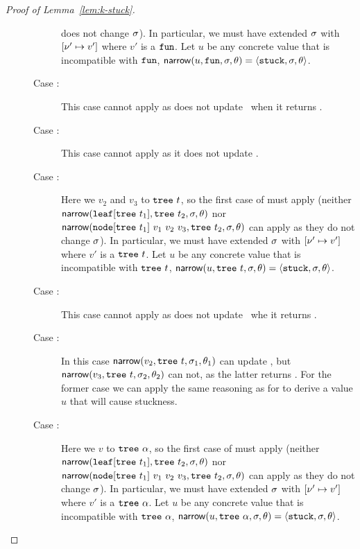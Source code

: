 \begin{proof}[Proof of Lemma~\ref{lem:k-stuck}]
\begin{description}
\begin{description}
      does not change $\sigma$).
      In particular, we must have extended $\sigma$ with
      $[\nu' \mapsto v']$ where $v'$ is a $\mathtt{fun}$.
      Let $u$ be any concrete value that is incompatible with $\mathtt{fun}$,
      $\mathsf{narrow}(u, \mathtt{fun}, \sigma, \theta) = \langle \mathtt{stuck}, \sigma, \theta \rangle$.
    \item[Case \reappbad:]
      This case cannot apply as \forcesym does not update \vsu\ when
      it returns \stuck.
    \item[Case \releafgood:]
      This case cannot apply as it does not update \vsu.
    \item[Case \renodegood:]
      Here we \forcesym $v_2$ and $v_3$ to $\mathtt{tree}\ t$, so the first
      case of \forcesym must apply
      (neither $\mathsf{narrow}(\mathtt{leaf}[\mathtt{tree}\ t_1], \mathtt{tree}\ t_2, \sigma, \theta)$
       nor\\ $\mathsf{narrow}(\mathtt{node}[\mathtt{tree}\ t_1]\ v_1\ v_2\ v_3, \mathtt{tree}\ t_2, \sigma, \theta)$
       can apply as they do not change $\sigma$).
      In particular, we must have extended $\sigma$ with
      $[\nu' \mapsto v']$ where $v'$ is a $\mathtt{tree}\ t$.
      Let $u$ be any concrete value that is incompatible with $\mathtt{tree}\ t$,
      $\mathsf{narrow}(u, \mathtt{tree}\ t, \sigma, \theta) = \langle \mathtt{stuck}, \sigma, \theta \rangle$.
    \item[Case \renodebadone:]
      This case cannot apply as \forcesym does not update \vsu\ whe
      it returns \stuck.
    \item[Case \renodebadtwo:]
      In this case $\mathsf{narrow}(v_2, \mathtt{tree}\ t, \sigma_1, \theta_1)$ can update
      \vsu, but $\mathsf{narrow}(v_3, \mathtt{tree}\ t, \sigma_2, \theta_2)$ can not, as the
      latter returns \stuck.
      For the former case we can apply the same reasoning as for
      \renodegood to derive a value $u$ that will cause stuckness.
    \item[Case \rulename{E-Case-Good\{1,2\}}:]
      Here we \forcesym $v$ to $\mathtt{tree}\ \alpha$, so the first case of \forcesym
      must apply
      (neither\\ $\mathsf{narrow}(\mathtt{leaf}[\mathtt{tree}\ t_1], \mathtt{tree}\ t_2, \sigma, \theta)$
       nor\\ $\mathsf{narrow}(\mathtt{node}[\mathtt{tree}\ t_1]\ v_1\ v_2\ v_3, \mathtt{tree}\ t_2, \sigma, \theta)$
       can apply as they do not change $\sigma$).
      In particular, we must have extended $\sigma$ with
      $[\nu' \mapsto v']$ where $v'$ is a $\mathtt{tree}\ \alpha$.
      Let $u$ be any concrete value that is incompatible with $\mathtt{tree}\ \alpha$,
      $\mathsf{narrow}(u, \mathtt{tree}\ \alpha, \sigma, \theta) = \langle \mathtt{stuck}, \sigma, \theta \rangle$.

\end{description}
\end{description}
\end{proof}

